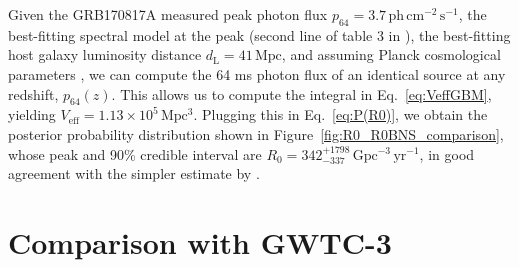 \documentclass[]{aa}
\begin{document}
\begin{appendix}
Given the GRB170817A measured \citep{Goldstein2017} peak photon flux $p_\mathrm{64}=3.7\,\mathrm{ph\,cm^{-2}\,s^{-1}}$, the best-fitting spectral model at the peak (second line of table 3 in \citealt{Goldstein2017}), the best-fitting host galaxy luminosity distance \citep{Hjorth2017} $d_\mathrm{L}=41\,\mathrm{Mpc}$, and assuming Planck cosmological parameters \citep{Planck2016}, we can compute the 64 ms photon flux of an identical source at any redshift, $p_{64}(z)$. This allows us to compute the integral in Eq.~\ref{eq:VeffGBM}, yielding $V_\mathrm{eff}=1.13\times 10^5\,\mathrm{Mpc^3}$. Plugging this in Eq.~\ref{eq:P(R0)}, we obtain the posterior probability distribution shown in Figure~\ref{fig:R0_R0BNS_comparison}, whose peak and 90\% credible interval are  $R_0=342_{-337}^{+1798}\,\mathrm{Gpc^{-3}\,yr^{-1}}$, in good agreement with the simpler estimate by \cite{DellaValle2018}. 

\section{Comparison with GWTC-3}\label{sec:GWTC3_comparison}
 

\end{appendix}
\end{document}
